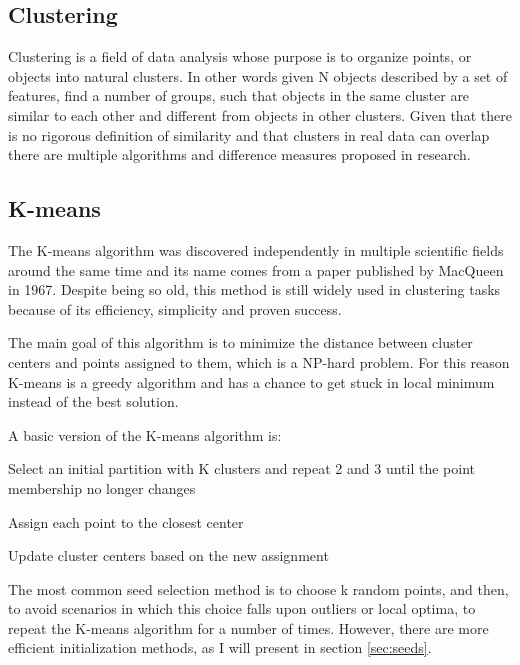 \documentclass[12pt]{article}
\begin{document}
	\subsection{Clustering}
	Clustering is a field of data analysis whose purpose is to organize points, or objects into natural clusters. In other words given N objects described by a set of features, find a number of groups, such that objects in the same cluster are similar to each other and different from objects in other clusters\cite{DataClustering50yearsBeyondKmeans}. Given that there is no rigorous definition of similarity and that clusters in real data can overlap there are multiple algorithms and difference measures proposed in research.
	
	\subsection{K-means}
	The K-means algorithm was discovered independently in multiple scientific fields around the same time and its name comes from a paper published by MacQueen in 1967\cite{DataClustering50yearsBeyondKmeans}. Despite being so old, this method is still widely used in clustering tasks because of its efficiency, simplicity and proven success.
	
	The main goal of this algorithm is to minimize the distance between cluster centers and points assigned to them, which is a NP-hard problem. For this reason K-means is a greedy algorithm and has a chance to get stuck in local minimum instead of the best solution\cite{DataClustering50yearsBeyondKmeans}.
	
	A basic version of the K-means algorithm is\cite{AlgorithmsForClusteringData}:
	\begin{compactenum}
		\item Select an initial partition with K clusters and repeat 2 and 3 until the point membership no longer changes
		\item Assign each point to the closest center
		\item Update cluster centers based on the new assignment
	\end{compactenum}

	The most common seed selection method is to choose k random points, and then, to avoid scenarios in which this choice falls upon outliers or local optima, to repeat the K-means algorithm for a number of times. However, there are more efficient initialization methods, as I will present in section \ref{sec:seeds}.
	
\end{document}
